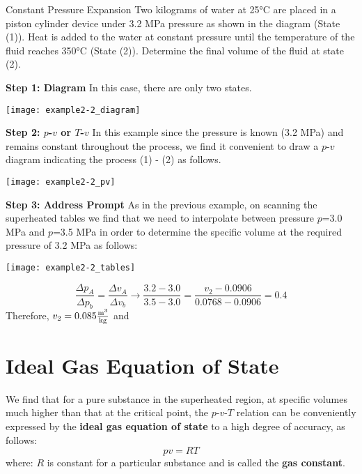 \begin{example}[label={ex:ch2constantPressure}]{Constant Pressure Expansion}
  Two kilograms of water at 25°C are placed in a piston cylinder device under 3.2 MPa pressure as shown in the diagram (State (1)). Heat is added to the water at constant pressure until the temperature of the fluid reaches 350°C (State (2)). Determine the final volume of the fluid at state (2).

  {\bf Step 1: Diagram} \quad In this case, there are only two states.

\begin{center}
\texttt{[image: example2-2\_diagram]}
\end{center}  

{\bf Step 2: $p$-$v$ or $T$-$v$} \quad In this example since the pressure is known (3.2 MPa) and remains constant throughout the process, we find it convenient to draw a $p$-$v$ diagram indicating the process (1) - (2) as follows.

\begin{center}
\texttt{[image: example2-2\_pv]}
\end{center}

{\bf Step 3: Address Prompt} \quad As in the previous example, on scanning the superheated tables we find that we need to interpolate between pressure $p$=3.0 MPa and $p$=3.5 MPa in order to determine the specific volume at the required pressure of 3.2 MPa as follows:

\begin{center}
\texttt{[image: example2-2\_tables]}
\end{center}

\begin{equation*}
  \frac{\Delta p_A}{\Delta p_b} = \frac{\Delta v_A}{\Delta v_b} \rightarrow \frac{3.2 - 3.0}{3.5-3.0} = \frac{v_2-0.0906}{0.0768-0.0906} = 0.4
\end{equation*}
Therefore, $v_2 = 0.085 \frac{\rm m^3}{\rm kg}$ and 

\end{example}

\section{Ideal Gas Equation of State}
We find that for a pure substance in the superheated region, at specific volumes much higher than that at the critical point, the $p$-$v$-$T$ relation can be conveniently expressed by the {\bf ideal gas equation of state} to a high degree of accuracy, as follows:
\begin{equation} \label{idealGasLaw}
  p v = R T
\end{equation}
where: $R$ is constant for a particular substance and is called the {\bf gas constant}.

